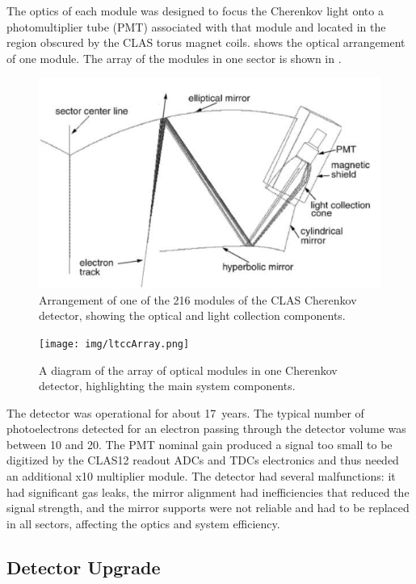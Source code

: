 The optics of each module was designed to focus the Cherenkov light onto a photomultiplier tube (PMT) associated
with that module and located in the region obscured by the CLAS torus magnet coils.  shows
the optical arrangement of one module. The array of the modules in one sector is shown in .

\begin{figure}[ht]
	\centering
	\includegraphics[width=1.0\columnwidth,keepaspectratio]{img/optics.png}
	\caption{Arrangement of one of the 216 modules of the CLAS Cherenkov detector, showing the optical and
          light collection components.}
	\label{fig:optics}
\end{figure}

\begin{figure}[ht]
	\centering
	\texttt{[image: img/ltccArray.png]}
	\caption{A diagram of the array of optical modules in one Cherenkov detector, highlighting
          the main system components.}
	\label{fig:ltccArray}
\end{figure}

The detector was operational for about 17~years. The typical number of photoelectrons detected for an electron
passing through the detector volume was between 10 and 20. The PMT nominal gain produced a signal too small
to be digitized by the CLAS12 readout ADCs and TDCs electronics and thus needed an additional x10 multiplier module.
The detector had several malfunctions: it had significant gas leaks, the
mirror alignment had inefficiencies that reduced the signal strength, and the mirror supports were not reliable
and had to be replaced in all
sectors, affecting the optics and system efficiency.

\subsection{Detector Upgrade}


